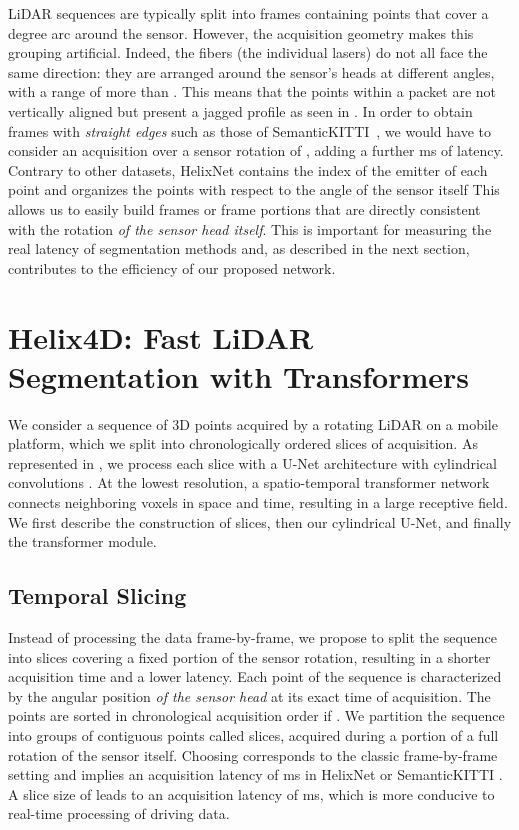 \documentclass[runningheads]{tpls/llncs}
\begin{document}
LiDAR sequences are typically split into frames containing points that cover a  degree arc around the sensor. However, the acquisition geometry makes this grouping artificial.
Indeed, the fibers (\ie the individual lasers) do not all face the same direction: they are arranged around the sensor's heads at different angles, with a range of more than . This means that the points within a packet are not vertically aligned but present a jagged profile as seen in . In order to obtain frames with \emph{straight edges} such as those of SemanticKITTI~\cite{behley2019iccv}, we would have to consider an acquisition over a sensor rotation of , adding a further ms of latency.
Contrary to other datasets, HelixNet contains the index of the emitter of each point and organizes the points with respect to the angle of the sensor itself
This allows us to easily build frames or frame portions that are directly consistent with the rotation \emph{of the sensor head itself}. This is important for measuring the real latency of segmentation methods and, as described in the next section, contributes to the efficiency of our proposed network. \section{Helix4D: Fast LiDAR Segmentation with  Transformers}\label{sec:method}

We consider a sequence of 3D points acquired by a rotating LiDAR on a mobile platform, which we split into chronologically ordered slices of acquisition. As represented in , we process each slice with a U-Net architecture \cite{ronneberger2015u} with cylindrical convolutions \cite{zhu2021cylindrical}. At the lowest resolution, a spatio-temporal transformer network connects neighboring voxels in space and time, resulting in a large receptive field.
We first describe the construction of slices, then our cylindrical U-Net, and finally the transformer module.
\subsection{Temporal Slicing}\label{sec:slices}
Instead of processing the data frame-by-frame, we propose to split the sequence into slices covering a fixed portion of the sensor rotation, resulting in a shorter acquisition time and a lower latency.
Each point  of the sequence is characterized by the angular position  \emph{of the sensor head} at its exact time of acquisition. The points are sorted in chronological acquisition order \ie  if .
We partition the sequence into groups of contiguous points called slices, acquired during a portion  of a full rotation of the sensor itself. Choosing  corresponds to the classic frame-by-frame setting and implies an acquisition latency of ms in HelixNet or SemanticKITTI \cite{behley2019iccv}. A slice size of  leads to an acquisition latency of ms, which is more conducive to real-time processing of driving data.
\end{document}
